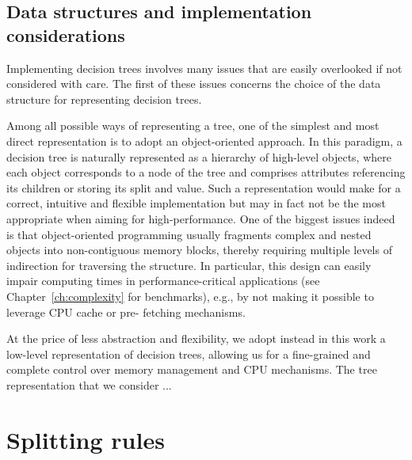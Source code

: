 \subsection{Data structures and implementation considerations}

Implementing decision trees involves many issues that are easily overlooked if
not considered with care. The first of these issues concerns the choice of the
data structure for representing decision trees.

Among all possible ways of representing a tree, one of the simplest and most
direct representation is to adopt an object-oriented approach. In this
paradigm, a decision tree is naturally represented as a hierarchy of high-level
objects, where each object corresponds to a node of the tree and comprises
attributes referencing its children or storing its split and value. Such a
representation would make for a correct, intuitive and flexible implementation
but may in fact not be the most appropriate when aiming for high-performance.
One of the biggest issues indeed is that object-oriented programming usually
fragments complex and nested objects into non-contiguous memory blocks, thereby
requiring multiple levels of indirection for traversing the structure. In
particular, this design can easily impair computing times in
performance-critical applications (see Chapter~\ref{ch:complexity} for
benchmarks), e.g., by not making it possible to leverage CPU cache or pre-
fetching mechanisms.

At the price of less abstraction and flexibility, we adopt instead in this work
a low-level representation of decision trees, allowing us for a fine-grained
and complete control over memory management and CPU mechanisms. The tree
representation that we consider ...



\section{Splitting rules}
\label{sec:3:splitting-rules}


